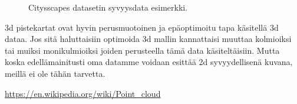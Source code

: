 \begin{figure}
\centering
{}
\caption[Tämä on lyhyt kuvateksti.]{Citysscapes datasetin syvyysdata esimerkki.}
\label{fig:depth}
\end{figure}

3d pistekartat ovat hyvin perusmuotoinen ja epäoptimoitu tapa käsitellä 3d dataa. Jos sitä haluttaisiin optimoida 3d mallin kannattaisi muuttaa kolmioiksi tai muiksi monikulmioiksi joiden perusteella tämä data käsiteltäisiin. Mutta koska edellämainitusti oma datamme voidaan esittää 2d syvyydellisenä kuvana, meillä ei ole tähän tarvetta.

    
\url{https://en.wikipedia.org/wiki/Point_cloud}

